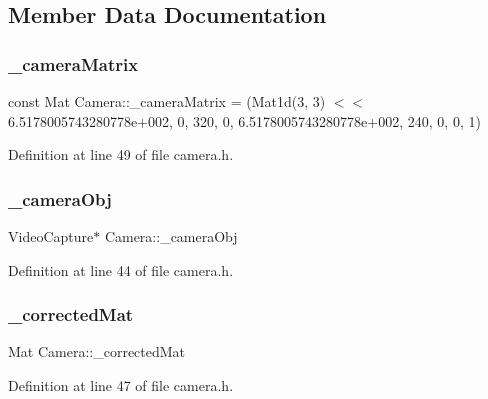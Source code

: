 \subsection{Member Data Documentation}
\mbox{\label{classCamera_a1e024292a6e5481b8719ec16c34121e6}} 
\subsubsection{\texorpdfstring{\_cameraMatrix}{\_cameraMatrix}}
{\footnotesize\ttfamily const Mat Camera\+::\+\_\+camera\+Matrix = (Mat1d(3, 3) $<$$<$ 6.\+5178005743280778e+002, 0, 320, 0, 6.\+5178005743280778e+002, 240, 0, 0, 1)\hspace{0.3cm}{\ttfamily [private]}}



Definition at line 49 of file camera.\+h.

\mbox{\label{classCamera_a4b052388a85d60aaca71726e1d8dbea9}} 
\subsubsection{\texorpdfstring{\_cameraObj}{\_cameraObj}}
{\footnotesize\ttfamily Video\+Capture$\ast$ Camera\+::\+\_\+camera\+Obj\hspace{0.3cm}{\ttfamily [private]}}



Definition at line 44 of file camera.\+h.

\mbox{\label{classCamera_aadacf0c0381546be20b9c707f8e88a42}} 
\subsubsection{\texorpdfstring{\_correctedMat}{\_correctedMat}}
{\footnotesize\ttfamily Mat Camera\+::\+\_\+corrected\+Mat\hspace{0.3cm}{\ttfamily [private]}}



Definition at line 47 of file camera.\+h.

\mbox{\label{classCamera_af0a36cb5108ca656eccd85c58508ae5f}} 
